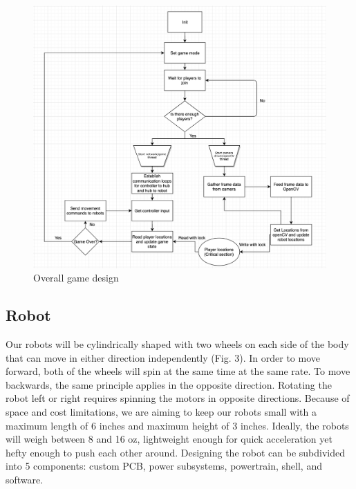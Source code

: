 \documentclass[11pt]{ieeeconf}
\begin{document}
 \begin{figure}[!t]
  \centering
  \captionsetup{justification=centering}
      \includegraphics[width=14cm]{images/Flowchart.png}
        \caption{Overall game design}
        \label{flowchart}
\end{figure}

\subsection{Robot}
Our robots will be cylindrically shaped with two wheels on each side of the body that can move in either direction independently (Fig. 3). In order to move forward, both of the wheels will spin at the same time at the same rate. To move backwards, the same principle applies in the opposite direction. Rotating the robot left or right requires spinning the motors in opposite directions. Because of space and cost limitations, we are aiming to keep our robots small with a maximum length of 6 inches and maximum height of 3 inches. Ideally, the robots will weigh between 8 and 16 oz, lightweight enough for quick acceleration yet hefty enough to push each other around. Designing the robot can be subdivided into 5 components: custom PCB, power subsystems, powertrain, shell, and software.
\end{document}
